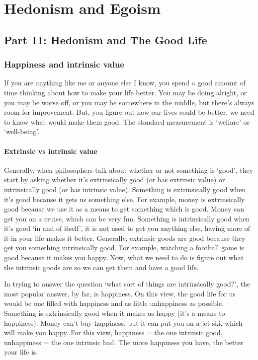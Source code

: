 \part{Hedonism and Egoism}
\label{ch.mod4}
\chapter{Part 11: Hedonism and The Good Life}

\section{Happiness and intrinsic value}

If you are anything like me or anyone else I know, you spend a good amount of time thinking about how to make your life better. You may be doing alright, or you may be worse off, or you may be somewhere in the middle, but there’s always room for improvement. But, you figure out how our lives could be better, we need to know what would make them good. The standard measurement is ‘welfare’ or ‘well-being’.
\subsection{Extrinsic vs intrinsic value}

Generally, when philosophers talk about whether or not something is ‘good’, they start by asking whether it’s extrinsically good (or has extrinsic value) or intrinsically good (or has intrinsic value). Something is extrinsically good when it’s good because it gets us something else. For example, money is extrinsically good because we use it as a means to get something which is good. Money can get you on a cruise, which can be very fun. Something is intrinsically good when it’s good ‘in and of itself’, it is not used to get you anything else, having more of it in your life makes it better. Generally, extrinsic goods are good because they get you something intrinsically good. For example, watching a football game is good because it makes you happy. Now, what we need to do is figure out what the intrinsic goods are so we can get them and have a good life.

In trying to answer the question ‘what sort of things are intrinsically good?’, the most popular answer, by far, is happiness. On this view, the good life for us would be one filled with happiness and as little unhappiness as possible. Something is extrinsically good when it makes us happy (it’s a means to happiness). Money can’t buy happiness, but it can put you on a jet ski, which will make you happy. For this view, happiness = the one intrinsic good, unhappiness = the one intrinsic bad. The more happiness you have, the better your life is.


